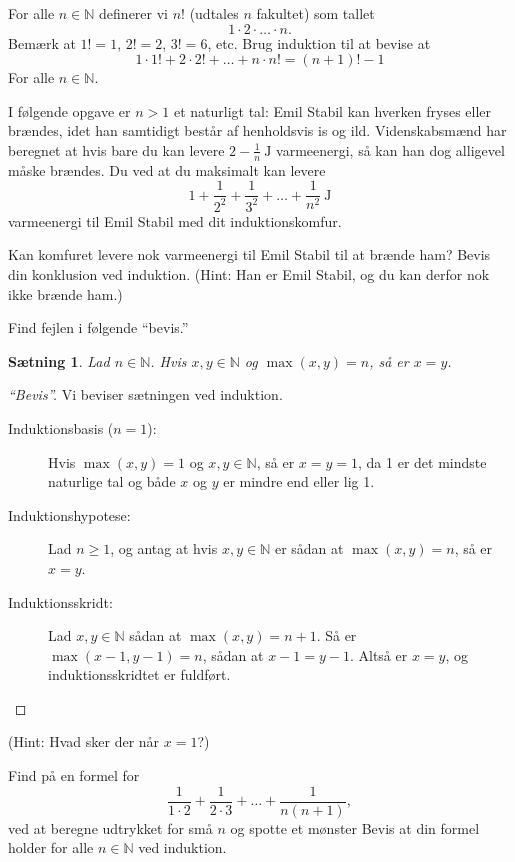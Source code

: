 \documentclass[a4paper,12pt]{article}
\theoremstyle{plain}
\newtheorem{saetning}{Sætning}[section]
\newcommand{\N}{\mathbb{N}}
\begin{document}
\begin{Exercise}
For alle \(n\in\N\) definerer vi \(n!\) (udtales \(n\) fakultet) som tallet
\[
    1\cdot 2\cdot\dots\cdot n.
\]
Bemærk at \(1!=1\), \(2!=2\), \(3!=6\), etc. Brug induktion til at bevise at
\[
    1\cdot 1!+2\cdot 2!+\dots+n\cdot n!=(n+1)!-1
\]
For alle \(n\in\N\).
\end{Exercise}
\begin{Exercise}
  I følgende opgave er \(n>1\) et naturligt tal: Emil Stabil kan hverken fryses eller brændes, idet han samtidigt består af henholdsvis is og ild. Videnskabsmænd har beregnet at hvis bare du kan levere \( 2-\frac{1}{n}\ \mathrm{J}\) varmeenergi, så kan han dog alligevel måske brændes. Du ved at du maksimalt kan levere
  \[
    1+\frac{1}{2^2}+\frac{1}{3^2}+\dots+\frac{1}{n^2}\ \mathrm{J}
  \]
  varmeenergi til Emil Stabil med dit induktionskomfur.

  Kan komfuret levere nok varmeenergi til Emil Stabil til at brænde ham? Bevis din konklusion ved induktion. (Hint: Han er Emil Stabil, og du kan derfor nok ikke brænde ham.) 
\end{Exercise}
\begin{Exercise}
  Find fejlen i følgende ``bevis.'' 
\begin{saetning}
  Lad \(n\in\N\). Hvis \(x,y\in\N\) og \(\max(x,y)=n\), så er \(x=y\).
\end{saetning}
\begin{proof}[``Bevis'']
  Vi beviser sætningen ved induktion.
  \begin{description}
    \item[Induktionsbasis (\(n=1\)):] Hvis \(\max(x,y)=1\) og \(x,y\in\N\), så er \(x=y=1\), da 1 er det mindste naturlige tal og både \(x\) og \(y\) er mindre end eller lig 1.
    \item[Induktionshypotese:] Lad \(n\ge 1\), og antag at hvis \(x,y\in\N\) er sådan at \(\max(x,y)=n\), så er \(x=y\).
    \item[Induktionsskridt:] Lad \(x,y\in\N\) sådan at \(\max(x,y)=n+1\). Så er \(\max(x-1,y-1)=n\), sådan at \(x-1=y-1\). Altså er \(x=y\), og induktionsskridtet er fuldført.
  \end{description}
\end{proof}
 (Hint: Hvad sker der når \(x=1\)?)
\end{Exercise}
\begin{Exercise}[label={ex:6}]
  \Question Find på en formel for
  \[
    \frac{1}{1\cdot 2}+\frac{1}{2\cdot 3}+\dots+\frac{1}{n(n+1)},
  \]
  ved at beregne udtrykket for små \(n\) og spotte et mønster
  \Question Bevis at din formel holder for alle \(n\in\N\) ved induktion.
\end{Exercise}
\end{document}
